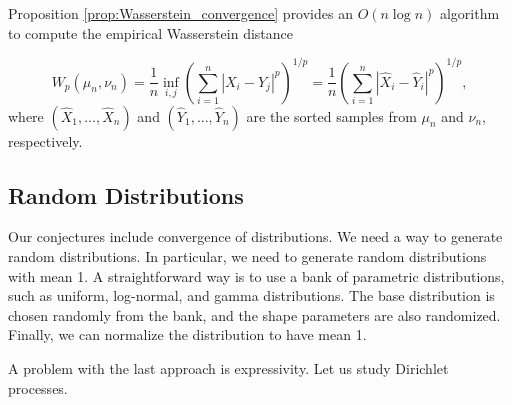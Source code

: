 Proposition \ref{prop:Wasserstein_convergence} provides an $O(n\log n)$ algorithm to compute the empirical Wasserstein distance

\begin{equation}
  W_p(\mu_n, \nu_n) =  \frac{1}{n} \inf_{i,j} \left( \sum_{i=1}^n |X_i - Y_j|^p \right)^{1/p} = \frac{1}{n} \left(  \sum_{i=1}^n |\hat{X}_{i} - \hat{Y}_{i}|^p \right)^{1/p},
\end{equation}
where $(\hat{X}_1, \ldots, \hat{X}_n)$ and $(\hat{Y}_1, \ldots, \hat{Y}_n)$ are the sorted samples from $\mu_n$ and $\nu_n$, respectively.

\subsection{Random Distributions}
Our conjectures include convergence of distributions. We need a way to generate random distributions. In particular, we need to generate random distributions with mean 1. A straightforward way is to use a bank of parametric distributions, such as uniform, log-normal, and gamma distributions. The base distribution is chosen randomly from the bank, and the shape parameters are also randomized. Finally, we can normalize the distribution to have mean 1.

A problem with the last approach is expressivity. Let us study Dirichlet processes.